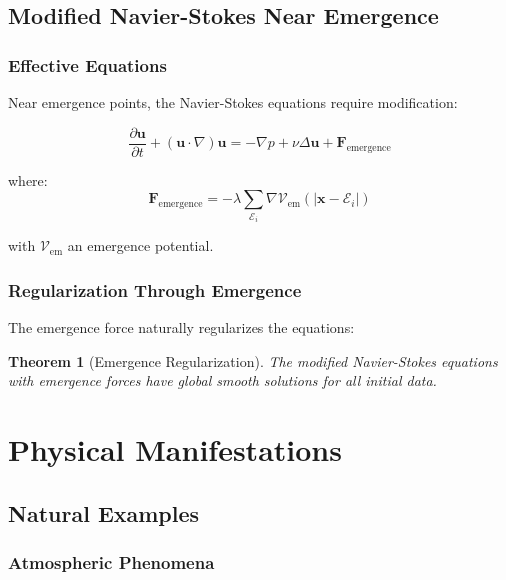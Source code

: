 \documentclass[12pt]{article}
\newcommand{\emergencept}{\mathcal{E}}
\newtheorem{theorem}{Theorem}[section]
\begin{document}
\subsection{Modified Navier-Stokes Near Emergence}

\subsubsection{Effective Equations}

Near emergence points, the Navier-Stokes equations require modification:

\begin{equation}
\frac{\partial \mathbf{u}}{\partial t} + (\mathbf{u} \cdot \nabla)\mathbf{u} = -\nabla p + \nu \Delta \mathbf{u} + \mathbf{F}_{\text{emergence}}
\end{equation}

where:
\begin{equation}
\mathbf{F}_{\text{emergence}} = -\lambda \sum_{\emergencept_i} \nabla \mathcal{V}_{\text{em}}(|\mathbf{x} - \emergencept_i|)
\end{equation}

with $\mathcal{V}_{\text{em}}$ an emergence potential.

\subsubsection{Regularization Through Emergence}

The emergence force naturally regularizes the equations:

\begin{theorem}[Emergence Regularization]
The modified Navier-Stokes equations with emergence forces have global smooth solutions for all initial data.
\end{theorem}

\section{Physical Manifestations}

\subsection{Natural Examples}

\subsubsection{Atmospheric Phenomena}
\end{document}
